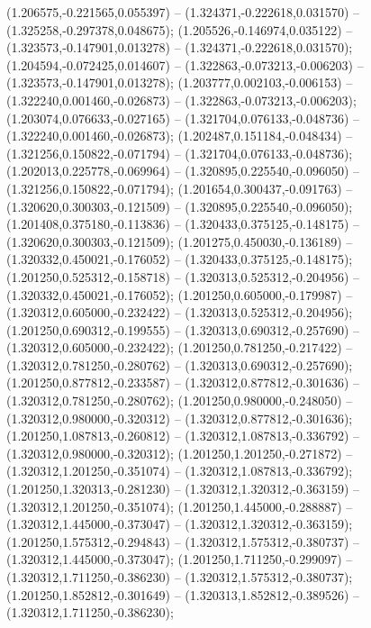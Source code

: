  (1.206575,-0.221565,0.055397) -- (1.324371,-0.222618,0.031570) -- (1.325258,-0.297378,0.048675);
 (1.205526,-0.146974,0.035122) -- (1.323573,-0.147901,0.013278) -- (1.324371,-0.222618,0.031570);
 (1.204594,-0.072425,0.014607) -- (1.322863,-0.073213,-0.006203) -- (1.323573,-0.147901,0.013278);
 (1.203777,0.002103,-0.006153) -- (1.322240,0.001460,-0.026873) -- (1.322863,-0.073213,-0.006203);
 (1.203074,0.076633,-0.027165) -- (1.321704,0.076133,-0.048736) -- (1.322240,0.001460,-0.026873);
 (1.202487,0.151184,-0.048434) -- (1.321256,0.150822,-0.071794) -- (1.321704,0.076133,-0.048736);
 (1.202013,0.225778,-0.069964) -- (1.320895,0.225540,-0.096050) -- (1.321256,0.150822,-0.071794);
 (1.201654,0.300437,-0.091763) -- (1.320620,0.300303,-0.121509) -- (1.320895,0.225540,-0.096050);
 (1.201408,0.375180,-0.113836) -- (1.320433,0.375125,-0.148175) -- (1.320620,0.300303,-0.121509);
 (1.201275,0.450030,-0.136189) -- (1.320332,0.450021,-0.176052) -- (1.320433,0.375125,-0.148175);
 (1.201250,0.525312,-0.158718) -- (1.320313,0.525312,-0.204956) -- (1.320332,0.450021,-0.176052);
 (1.201250,0.605000,-0.179987) -- (1.320312,0.605000,-0.232422) -- (1.320313,0.525312,-0.204956);
 (1.201250,0.690312,-0.199555) -- (1.320313,0.690312,-0.257690) -- (1.320312,0.605000,-0.232422);
 (1.201250,0.781250,-0.217422) -- (1.320312,0.781250,-0.280762) -- (1.320313,0.690312,-0.257690);
 (1.201250,0.877812,-0.233587) -- (1.320312,0.877812,-0.301636) -- (1.320312,0.781250,-0.280762);
 (1.201250,0.980000,-0.248050) -- (1.320312,0.980000,-0.320312) -- (1.320312,0.877812,-0.301636);
 (1.201250,1.087813,-0.260812) -- (1.320312,1.087813,-0.336792) -- (1.320312,0.980000,-0.320312);
 (1.201250,1.201250,-0.271872) -- (1.320312,1.201250,-0.351074) -- (1.320312,1.087813,-0.336792);
 (1.201250,1.320313,-0.281230) -- (1.320312,1.320312,-0.363159) -- (1.320312,1.201250,-0.351074);
 (1.201250,1.445000,-0.288887) -- (1.320312,1.445000,-0.373047) -- (1.320312,1.320312,-0.363159);
 (1.201250,1.575312,-0.294843) -- (1.320312,1.575312,-0.380737) -- (1.320312,1.445000,-0.373047);
 (1.201250,1.711250,-0.299097) -- (1.320312,1.711250,-0.386230) -- (1.320312,1.575312,-0.380737);
 (1.201250,1.852812,-0.301649) -- (1.320313,1.852812,-0.389526) -- (1.320312,1.711250,-0.386230);
